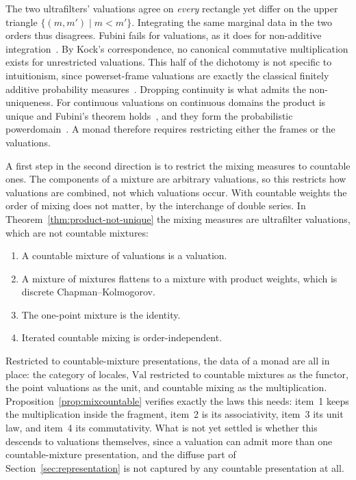 The two ultrafilters' valuations agree on
\emph{every} rectangle yet differ on the upper triangle
$\{(m, m') \mid m < m'\}$.
Integrating the same marginal data in the two orders thus
disagrees.  Fubini fails for valuations, as it does for non-additive
integration~\cite{denneberg1994,ghirardato1997}.  By Kock's
correspondence, no canonical commutative
multiplication exists for unrestricted valuations.  This half of the
dichotomy is not specific to intuitionism, since powerset-frame
valuations are exactly the classical finitely additive probability
measures~\cite{bhaskara-rao1983}. Dropping continuity is what admits
the non-uniqueness. For continuous valuations on continuous domains the
product is unique and Fubini's theorem holds~\cite{jones1990}, and they
form the probabilistic powerdomain~\cite{jones-plotkin1989}.  A monad therefore requires restricting either
the frames or the valuations.

A first step in the second direction is to restrict the mixing
measures to countable ones. The components of a mixture are arbitrary
valuations, so this restricts how valuations are combined, not which
valuations occur. With countable weights the order of mixing does not
matter, by the interchange of double series. In
Theorem~\ref{thm:product-not-unique} the mixing measures are ultrafilter
valuations, which are not countable mixtures:

\begin{proposition}
\label{prop:mixcountable}
\begin{enumerate}
\item A countable mixture of valuations is a
  valuation.
\item A mixture of mixtures flattens to a mixture with product
  weights, which is discrete
  Chapman--Kolmogorov.
\item The one-point mixture is the
  identity.
\item Iterated countable mixing is
  order-independent.
\end{enumerate}
\end{proposition}

\noindent
Restricted to countable-mixture presentations, the data of a monad are
all in place: the category of locales, $\mathrm{Val}$ restricted to
countable mixtures as the functor, the point valuations as the unit,
and countable mixing as the multiplication.
Proposition~\ref{prop:mixcountable} verifies exactly the laws this
needs: item~1 keeps the multiplication inside the fragment, item~2 is
its associativity, item~3 its unit law, and item~4 its commutativity.
What is not yet settled is whether this descends to valuations
themselves, since a valuation can admit more than one countable-mixture
presentation, and the diffuse part of Section~\ref{sec:representation}
is not captured by any countable presentation at all.
